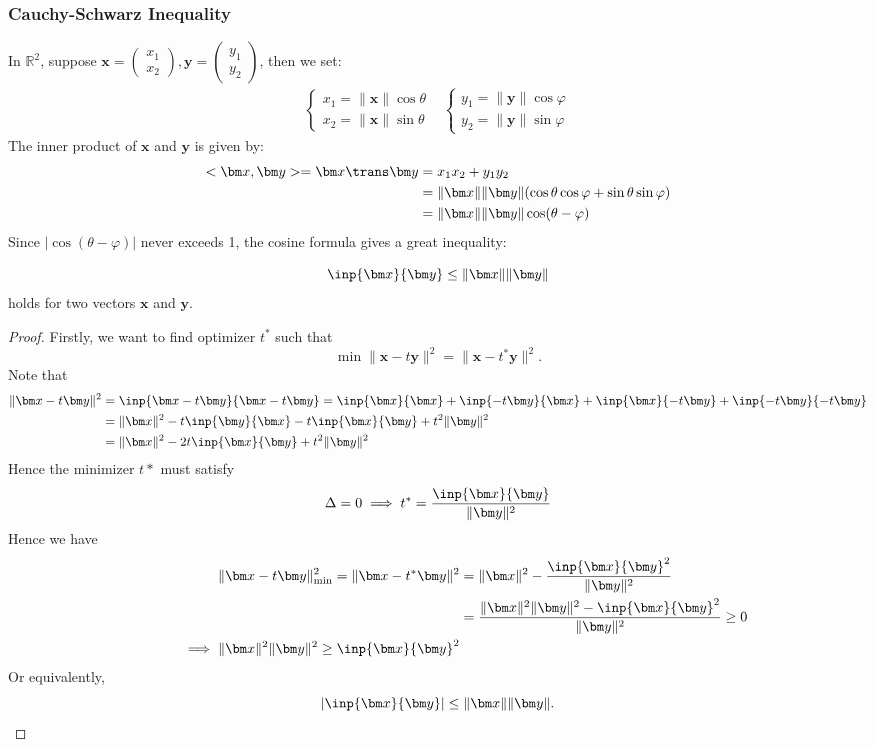 \subsubsection{Cauchy-Schwarz Inequality}
In $\mathbb{R}^2$, suppose $\bm x=\begin{pmatrix}
x_1\\x_2
\end{pmatrix},\bm y=\begin{pmatrix}
y_1\\y_2
\end{pmatrix}$, then we set:
\[
\begin{array}{ll}
\left\{
\begin{aligned}
x_1=\|\bm x\|\cos\theta\\
x_2=\|\bm x\|\sin\theta
\end{aligned}
\right.
&
\left\{
\begin{aligned}
y_1=\|\bm y\|\cos\varphi\\
y_2=\|\bm y\|\sin\varphi
\end{aligned}
\right.
\end{array}
\]
The inner product of $\bm x$ and $\bm y$ is given by:
\[
\begin{aligned}
<\bm x,\bm y>=\bm x\trans\bm y&=x_1x_2+y_1y_2\\
											 &=\|\bm x\|\|\bm y\|(\cos\theta\cos\varphi+\sin\theta\sin\varphi)\\
											 &=\|\bm x\|\|\bm y\|\cos(\theta-\varphi)
\end{aligned}
\]
Since $|\cos(\theta-\varphi)|$ never exceeds 1, the cosine formula gives a great inequality:
\begin{theorem}
\[
\inp{\bm x}{\bm y}\le\|\bm x\|\|\bm y\|
\]
holds for two vectors $\bm x$ and $\bm y$.
\end{theorem}
\begin{proof}
Firstly, we want to find optimizer $t^{*}$ such that 
\[
\min\|\bm x-t\bm y\|^2=\|\bm x-t^{*}\bm y\|^2.
\]
Note that
\[\begin{aligned}
\|\bm x-t\bm y\|^2&=\inp{\bm x-t\bm y}{\bm x-t\bm y}=\inp{\bm x}{\bm x}+\inp{-t\bm y}{\bm x}+\inp{\bm x}{-t\bm y}+\inp{-t\bm y}{-t\bm y}\\
&=\|\bm x\|^2-t\inp{\bm y}{\bm x}-t\inp{\bm x}{\bm y}+t^2\|\bm y\|^2\\
&=\|\bm x\|^2-2t\inp{\bm x}{\bm y}+t^2\|\bm y\|^2
\end{aligned}
\]
Hence the minimizer $t*$ must satisfy
\[
\Delta=0\implies
t^{*}=\frac{\inp{\bm x}{\bm y}}{\|\bm y\|^2}
\]
Hence we have 
\[\begin{aligned}
\|\bm x-t\bm y\|^2_{\min}=\|\bm x-t^*\bm y\|^2&=
\|\bm x\|^2-\frac{\inp{\bm x}{\bm y}^2}{\|\bm y\|^2}\\
&=\frac{\|\bm x\|^2\|\bm y\|^2-\inp{\bm x}{\bm y}^2}{\|\bm y\|^2}\ge 0\\
\qquad\qquad\implies
\|\bm x\|^2\|\bm y\|^2\ge\inp{\bm x}{\bm y}^2
\end{aligned}
\]
Or equivalently,
\[
|\inp{\bm x}{\bm y}|\le\|\bm x\|\|\bm y\|.
\]
\end{proof}
